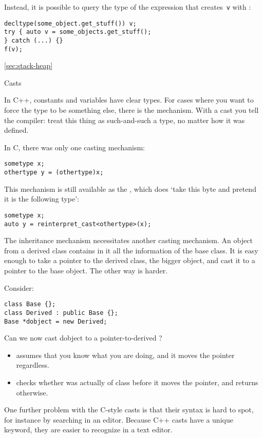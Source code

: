 Instead, it is possible to query the type of the expression that
creates~\lstinline{v} with :
\begin{lstlisting}
decltype(some_object.get_stuff()) v;
try { auto v = some_objects.get_stuff(); 
} catch (...) {}
f(v);
\end{lstlisting}

\ref{sec:stack-heap}


 {Casts}
\label{sec:cast}

In C++, constants and variables have clear types. For cases where you
want to force the type to be something else, there is the
 mechanism. With a cast you tell the compiler:
treat this thing as such-and-such a type, no matter how it was
defined.

In C, there was only one casting mechanism:
\begin{lstlisting}
sometype x;
othertype y = (othertype)x;
\end{lstlisting}
This mechanism is still available as the
, which does `take this byte and pretend
it is the following type':
\begin{lstlisting}
sometype x;
auto y = reinterpret_cast<othertype>(x);
\end{lstlisting}

The inheritance mechanism necessitates another casting mechanism.
An object from a derived class contains in it all the information of
the base class. It is easy enough to take a pointer to the derived
class, the bigger object, and cast it to a pointer to the base object.
The other way is harder.

Consider:
\begin{lstlisting}
class Base {};
class Derived : public Base {};
Base *dobject = new Derived;
\end{lstlisting}
Can we now cast dobject to a pointer-to-derived ?
\begin{itemize}
\item {} assumes that you know what you are
  doing, and it moves the pointer regardless.
\item {} checks whether  was
  actually of class  before it moves the pointer, and
  returns  otherwise.
\end{itemize}

\begin{remark}
  One further problem with the C-style casts is that their syntax is
  hard to spot, for instance by searching in an editor.
  Because C++ casts have a unique keyword, they are easier to recognize
  in a text editor.
\end{remark}

